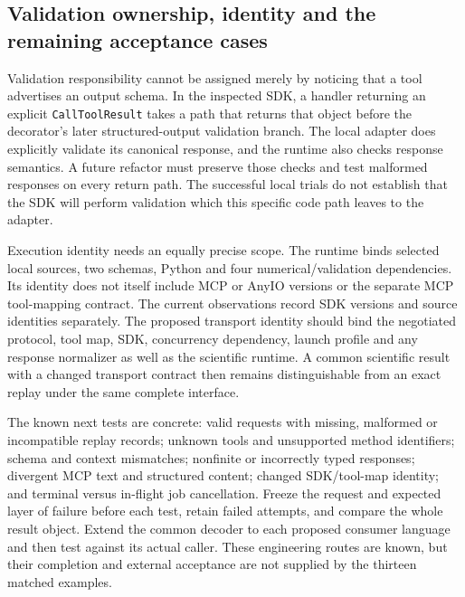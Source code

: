 \subsection{Validation ownership, identity and the remaining acceptance cases}

Validation responsibility cannot be assigned merely by noticing that a tool
advertises an output schema. In the inspected SDK, a handler returning an
explicit \texttt{CallToolResult} takes a path that returns that object before
the decorator's later structured-output validation branch. The local adapter
does explicitly validate its canonical response, and the runtime also checks
response semantics. A future refactor must preserve those checks and test
malformed responses on every return path. The successful local trials do not
establish that the SDK will perform validation which this specific code path
leaves to the adapter. \citep{exec16_parity_observed}

Execution identity needs an equally precise scope. The runtime binds selected
local sources, two schemas, Python and four numerical/validation dependencies.
Its identity does not itself include MCP or AnyIO versions or the separate
MCP tool-mapping contract. The current observations record SDK versions and
source identities separately. The proposed transport identity should bind
the negotiated protocol, tool map, SDK, concurrency dependency, launch profile
and any response normalizer as well as the scientific runtime. A common
scientific result with a changed transport contract then remains distinguishable
from an exact replay under the same complete interface.
\citep{exec16_parity_observed,exec16_parity_design}

The known next tests are concrete: valid requests with missing, malformed or
incompatible replay records; unknown tools and unsupported method identifiers;
schema and context mismatches; nonfinite or incorrectly typed responses;
divergent MCP text and structured content; changed SDK/tool-map identity;
and terminal versus in-flight job cancellation. Freeze the request and expected
layer of failure before each test, retain failed attempts, and compare the
whole result object. Extend the common decoder to each proposed consumer
language and then test against its actual caller. These engineering routes
are known, but their completion and external acceptance are not supplied by
the thirteen matched examples. \citep{exec16_parity_design}

